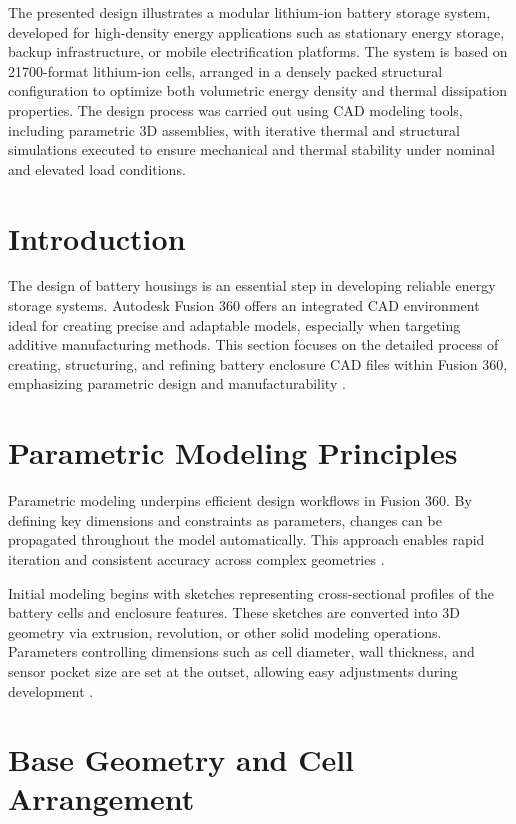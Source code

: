 The presented design illustrates a modular lithium-ion battery storage system, developed for high-density energy applications such as stationary energy storage, backup infrastructure, or mobile electrification platforms. The system is based on 21700-format lithium-ion cells, arranged in a densely packed structural configuration to optimize both volumetric energy density and thermal dissipation properties. The design process was carried out using CAD modeling tools, including parametric 3D assemblies, with iterative thermal and structural simulations executed to ensure mechanical and thermal stability under nominal and elevated load conditions.

\section{Introduction}

The design of battery housings is an essential step in developing reliable energy storage systems. Autodesk Fusion 360 offers an integrated CAD environment ideal for creating precise and adaptable models, especially when targeting additive manufacturing methods. This section focuses on the detailed process of creating, structuring, and refining battery enclosure CAD files within Fusion 360, emphasizing parametric design and manufacturability \cite{hogan2025}.

\section{Parametric Modeling Principles}

Parametric modeling underpins efficient design workflows in Fusion 360. By defining key dimensions and constraints as parameters, changes can be propagated throughout the model automatically. This approach enables rapid iteration and consistent accuracy across complex geometries \cite{anderson2020}.

Initial modeling begins with sketches representing cross-sectional profiles of the battery cells and enclosure features. These sketches are converted into 3D geometry via extrusion, revolution, or other solid modeling operations. Parameters controlling dimensions such as cell diameter, wall thickness, and sensor pocket size are set at the outset, allowing easy adjustments during development \cite{gebhardt2016}.

\section{Base Geometry and Cell Arrangement}

